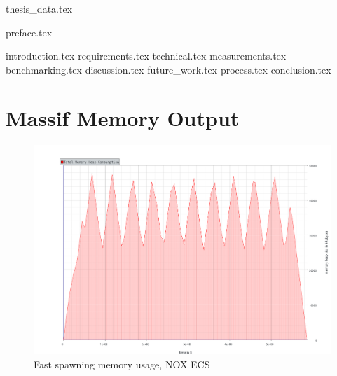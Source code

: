 \documentclass[BSP,english,oneside]{ntnuthesis/ntnubachelorthesis}
\newcommand{\todo}[1]{{\color{cyan}\lbrack todo: #1\rbrack}\\} %
\renewcommand{\todo}[1]{} %
\begin{document}
{thesis_data.tex}

\makefrontpages

{preface.tex}
\todo{Haha}

\tableofcontents
\listoffigures
\listoftables
\lstlistoflistings

{introduction.tex}
{requirements.tex}
{technical.tex}
{measurements.tex}
{benchmarking.tex}
{discussion.tex}
{future_work.tex}
{process.tex}
{conclusion.tex}






\appendix %
\chapter{Massif Memory Output}
\label{chap:appendix_massif_output}
\begin{figure}
    \includegraphics[scale=0.5]{benchmark_results/fast_spawn/ecs_massif_deletes_10.pdf}
    \caption{Fast spawning memory usage, NOX ECS}
\end{figure}
\end{document}
